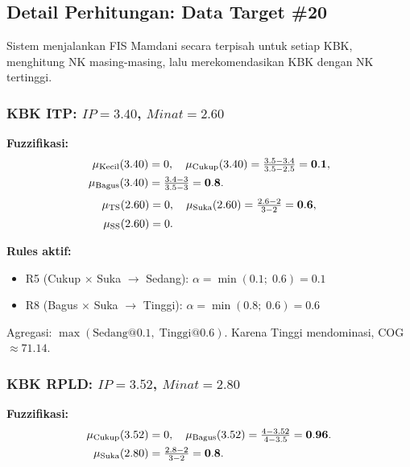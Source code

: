 \documentclass[conference]{IEEEtran}
\begin{document}
\subsection{Detail Perhitungan: Data Target \#20}

Sistem menjalankan FIS Mamdani secara terpisah untuk setiap KBK,
menghitung NK masing-masing, lalu merekomendasikan KBK dengan NK
tertinggi.

\subsubsection{KBK ITP: $IP=3.40$, $Minat=2.60$}

\textbf{Fuzzifikasi:}
\begin{align}
  \mu_{\text{Kecil}}(3.40) &= 0,\quad
  \mu_{\text{Cukup}}(3.40) = \tfrac{3.5-3.4}{3.5-2.5} = \mathbf{0.1}, \notag\\
  \mu_{\text{Bagus}}(3.40) &= \tfrac{3.4-3}{3.5-3} = \mathbf{0.8}. \notag
\end{align}
\begin{align}
  \mu_{\text{TS}}(2.60) &= 0,\quad
  \mu_{\text{Suka}}(2.60) = \tfrac{2.6-2}{3-2} = \mathbf{0.6}, \notag\\
  \mu_{\text{SS}}(2.60) &= 0. \notag
\end{align}

\textbf{Rules aktif:}
\begin{itemize}[nosep]
  \item R5 (Cukup $\times$ Suka $\to$ Sedang):
        $\alpha = \min(0.1;\;0.6) = 0.1$
  \item R8 (Bagus $\times$ Suka $\to$ Tinggi):
        $\alpha = \min(0.8;\;0.6) = 0.6$
\end{itemize}

Agregasi: $\max(\text{Sedang}@0.1,\;\text{Tinggi}@0.6)$.
Karena Tinggi mendominasi, COG $\approx 71.14$.

\subsubsection{KBK RPLD: $IP=3.52$, $Minat=2.80$}

\textbf{Fuzzifikasi:}
\begin{align}
  \mu_{\text{Cukup}}(3.52) &= 0,\quad
  \mu_{\text{Bagus}}(3.52) = \tfrac{4-3.52}{4-3.5} = \mathbf{0.96}. \notag\\
  \mu_{\text{Suka}}(2.80) &= \tfrac{2.8-2}{3-2} = \mathbf{0.8}. \notag
\end{align}
\end{document}
